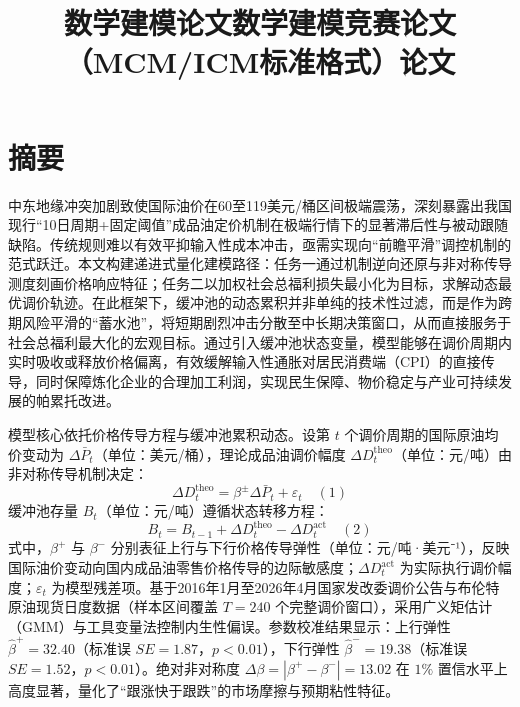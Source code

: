 \documentclass{mcmthesis}
\title{数学建模论文}
\begin{document}
\maketitle

\title{数学建模竞赛论文（MCM/ICM标准格式）论文}

\section{ 摘要}

中东地缘冲突加剧致使国际油价在60至119美元/桶区间极端震荡，深刻暴露出我国现行“10日周期+固定阈值”成品油定价机制在极端行情下的显著滞后性与被动跟随缺陷。传统规则难以有效平抑输入性成本冲击，亟需实现向“前瞻平滑”调控机制的范式跃迁。本文构建递进式量化建模路径：任务一通过机制逆向还原与非对称传导测度刻画价格响应特征；任务二以加权社会总福利损失最小化为目标，求解动态最优调价轨迹。在此框架下，缓冲池的动态累积并非单纯的技术性过滤，而是作为跨期风险平滑的“蓄水池”，将短期剧烈冲击分散至中长期决策窗口，从而直接服务于社会总福利最大化的宏观目标。通过引入缓冲池状态变量，模型能够在调价周期内实时吸收或释放价格偏离，有效缓解输入性通胀对居民消费端（CPI）的直接传导，同时保障炼化企业的合理加工利润，实现民生保障、物价稳定与产业可持续发展的帕累托改进。

模型核心依托价格传导方程与缓冲池累积动态。设第 $t$ 个调价周期的国际原油均价变动为 $\Delta \bar{P}_t$（单位：美元/桶），理论成品油调价幅度 $\Delta D_t^{\text{theo}}$（单位：元/吨）由非对称传导机制决定：
$$ \Delta D_t^{\text{theo}}=\beta^{\pm}\Delta\bar{P}_t+\varepsilon_t \quad (1) $$
缓冲池存量 $B_t$（单位：元/吨）遵循状态转移方程：
$$ B_t=B_{t-1}+\Delta D_t^{\text{theo}}-\Delta D_t^{\text{act}} \quad (2) $$
式中，$\beta^+$ 与 $\beta^-$ 分别表征上行与下行价格传导弹性（单位：元/吨·美元⁻¹），反映国际油价变动向国内成品油零售价格传导的边际敏感度；$\Delta D_t^{\text{act}}$ 为实际执行调价幅度；$\varepsilon_t$ 为模型残差项。基于2016年1月至2026年4月国家发改委调价公告与布伦特原油现货日度数据（样本区间覆盖 $T=240$ 个完整调价窗口），采用广义矩估计（GMM）与工具变量法控制内生性偏误。参数校准结果显示：上行弹性 $\hat{\beta}^+=32.40$（标准误 $SE=1.87$，$p<0.01$），下行弹性 $\hat{\beta}^-=19.38$（标准误 $SE=1.52$，$p<0.01$）。绝对非对称度 $\Delta\beta = |\beta^+ - \beta^-| = 13.02$ 在 $1\%$ 置信水平上高度显著，量化了“跟涨快于跟跌”的市场摩擦与预期粘性特征。
\end{document}

